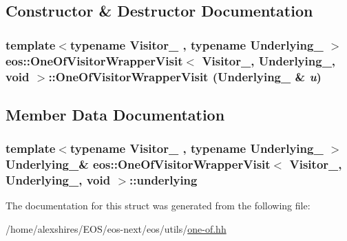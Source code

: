 \subsection{Constructor \& Destructor Documentation}
\hypertarget{structeos_1_1OneOfVisitorWrapperVisit_3_01Visitor___00_01Underlying___00_01void_01_4_a1b80f2f7d8924acef3cc5ea108ee7c86}{
\subsubsection[{OneOfVisitorWrapperVisit}]{\setlength{\rightskip}{0pt plus 5cm}template$<$typename Visitor\_\- , typename Underlying\_\- $>$ eos::OneOfVisitorWrapperVisit$<$ Visitor\_\-, Underlying\_\-, void $>$::OneOfVisitorWrapperVisit (Underlying\_\- \& {\em u})}}
\label{structeos_1_1OneOfVisitorWrapperVisit_3_01Visitor___00_01Underlying___00_01void_01_4_a1b80f2f7d8924acef3cc5ea108ee7c86}


\subsection{Member Data Documentation}
\hypertarget{structeos_1_1OneOfVisitorWrapperVisit_3_01Visitor___00_01Underlying___00_01void_01_4_af5c9cf70707be6778717c39739b2a962}{
\subsubsection[{underlying}]{\setlength{\rightskip}{0pt plus 5cm}template$<$typename Visitor\_\- , typename Underlying\_\- $>$ Underlying\_\-\& eos::OneOfVisitorWrapperVisit$<$ Visitor\_\-, Underlying\_\-, void $>$::{\bf underlying}}}
\label{structeos_1_1OneOfVisitorWrapperVisit_3_01Visitor___00_01Underlying___00_01void_01_4_af5c9cf70707be6778717c39739b2a962}


The documentation for this struct was generated from the following file:\begin{DoxyCompactItemize}
\item 
/home/alexshires/EOS/eos-\/next/eos/utils/\hyperlink{one-of_8hh}{one-\/of.hh}\end{DoxyCompactItemize}
